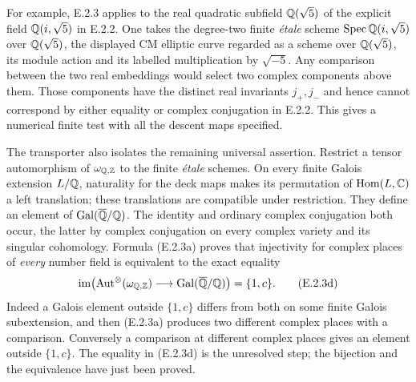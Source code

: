 For example, E.2.3 applies to the real quadratic subfield $\mathbb Q(\sqrt5)$ of the explicit field $\mathbb Q(i,\sqrt5)$ in E.2.2. One takes the degree-two finite \emph{\'etale} scheme $\operatorname{Spec}\mathbb Q(i,\sqrt5)$ over $\mathbb Q(\sqrt5)$, the displayed CM elliptic curve regarded as a scheme over $\mathbb Q(\sqrt5)$, its module action and its labelled multiplication by $\sqrt{-5}$. Any comparison between the two real embeddings would select two complex components above them. Those components have the distinct real invariants $j_+,j_-$ and hence cannot correspond by either equality or complex conjugation in E.2.2. This gives a numerical finite test with all the descent maps specified.

The transporter also isolates the remaining universal assertion. Restrict a tensor automorphism of $\omega_{\mathbb Q,\mathbb Z}$ to the finite \emph{\'etale} schemes. On every finite Galois extension $L/\mathbb Q$, naturality for the deck maps makes its permutation of $\operatorname{Hom}(L,\mathbb C)$ a left translation; these translations are compatible under restriction. They define an element of $\operatorname{Gal}(\overline{\mathbb Q}/\mathbb Q)$. The identity and ordinary complex conjugation both occur, the latter by complex conjugation on every complex variety and its singular cohomology. Formula (E.2.3a) proves that injectivity for complex places of \emph{every} number field is equivalent to the exact equality
\[
 \operatorname{im}\!\left(
   \operatorname{Aut}^\otimes(\omega_{\mathbb Q,\mathbb Z})\longrightarrow\operatorname{Gal}(\overline{\mathbb Q}/\mathbb Q)
                 \right)=\{1,c\}.
 \tag{E.2.3d}
\]
Indeed a Galois element outside $\{1,c\}$ differs from both on some finite Galois subextension, and then (E.2.3a) produces two different complex places with a comparison. Conversely a comparison at different complex places gives an element outside $\{1,c\}$. The equality in (E.2.3d) is the unresolved step; the bijection and the equivalence have just been proved.

